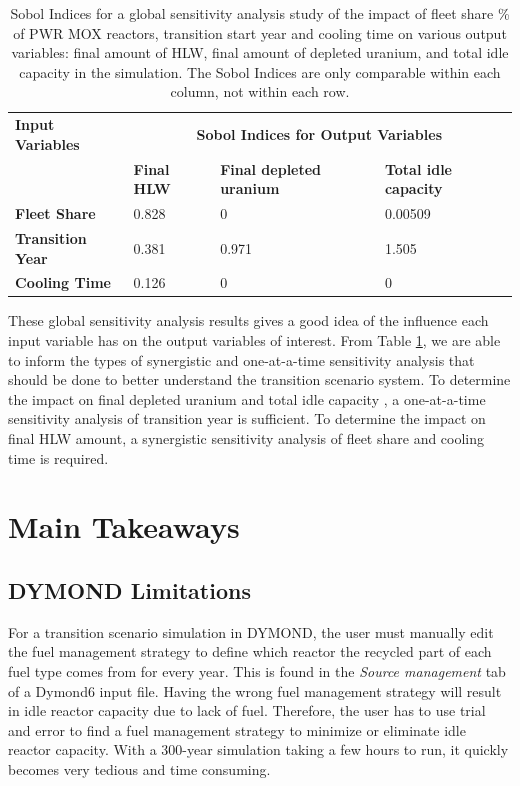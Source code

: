     \begin{table}[H]
        \centering
        \caption{Sobol Indices for a global sensitivity analysis study of the impact of 
        fleet share \% of PWR MOX reactors, transition start year and cooling time on various output
        variables: final amount of HLW, final amount of depleted uranium, and total 
        idle capacity in the simulation. The Sobol Indices are only comparable within each column, 
        not within each row.}
        \label{tab:sobol}
            \scriptsize
            \begin{tabular}{l|l|l|l}
                \hline	
                \textbf{Input Variables}                      & \multicolumn{3}{c}{\textbf{Sobol Indices for Output Variables}}   \\ \cline{2-4}
                & \textbf{Final HLW} & \textbf{Final depleted uranium} & \textbf{Total idle capacity} \\ \hline
                \textbf{Fleet Share} & 0.828     & 0                      & 0.00509             \\
                \textbf{Transition Year}                & 0.381     & 0.971                  & 1.505               \\
                \textbf{Cooling Time}                         & 0.126     & 0                      & 0                   \\ \hline

            \end{tabular}
    \end{table}

These global sensitivity analysis results gives a good idea of the influence each 
input variable has on the output variables of interest. 
From Table \ref{tab:sobol}, we are able to inform the types of synergistic and one-at-a-time 
sensitivity analysis that should be done to better understand the transition scenario system. 
To determine the impact on final depleted uranium and total idle capacity 
, a one-at-a-time sensitivity analysis of transition year is sufficient. 
To determine the impact on final HLW amount, a synergistic sensitivity analysis of fleet 
share and cooling time is required. 

\section{Main Takeaways}
\subsection{DYMOND Limitations}
For a transition scenario simulation in DYMOND, the user must 
manually edit the fuel management 
strategy to define which reactor the recycled 
part of each fuel type comes from for every year. 
This is found in the \textit{Source management} tab of a 
Dymond6 input file. 
Having the wrong fuel management strategy will result in idle reactor
capacity due to lack of fuel. 
Therefore, the user has to use trial and error to find a fuel 
management strategy to minimize or eliminate idle reactor capacity. 
With a 300-year simulation taking a few hours to run, it quickly 
becomes very tedious and time consuming.  

